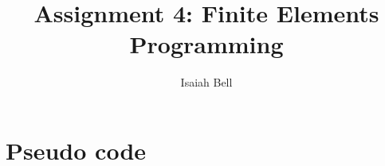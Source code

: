 \documentclass{article}
\begin{document}
\title{Assignment 4: Finite Elements Programming}
\author{Isaiah Bell} 
\maketitle
  
\section{Pseudo code}

\begin{algorithm}
\begin{algorithmic}

    
\EndProcedure

\end{algorithmic}
\end{algorithm}





\lstset{linewidth = 16cm, xrightmargin = 0cm}
\lstlistoflistings

\end{document}
